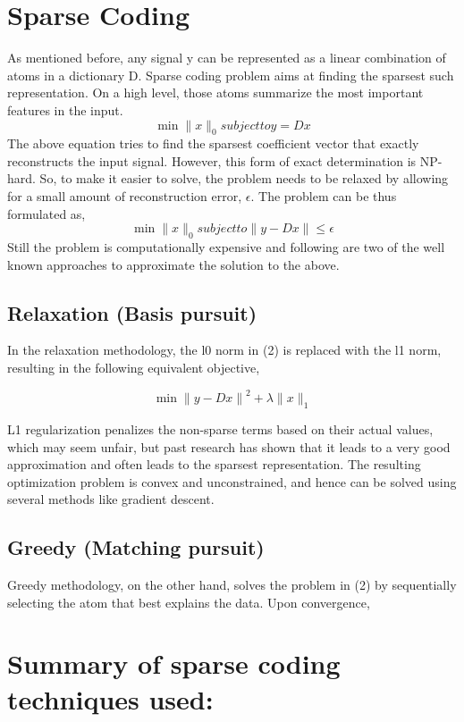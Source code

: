 \documentclass{article} %
\begin{document}
\section{Sparse Coding}
As mentioned before, any signal y can be represented as a linear combination of atoms in a dictionary D. Sparse coding problem aims at finding the sparsest such representation. On a high level, those atoms summarize the most important features in the input.\\
\[\min\|x\|_0  subject to y=Dx\]
The above equation tries to find the sparsest coefficient vector that exactly reconstructs the input signal. However, this form of exact determination is NP-hard. So, to make it easier to solve, the problem needs to be relaxed by allowing for a small amount of reconstruction error, $\epsilon$. The problem can be thus formulated as,\\
\[\min\|x\|_0  subject to \|y-Dx\| \leq \epsilon\]
Still the problem is computationally expensive and following are two of the well known approaches to approximate the solution to the above.
\subsection{Relaxation (Basis pursuit)}

In the relaxation methodology, the l0 norm in (2) is replaced with the l1 norm, resulting in the following equivalent objective,

\[\min{\|y-Dx\|}^2 +\lambda \|x\|_1\]

L1 regularization penalizes the non-sparse terms based on their actual values, which may seem unfair, but past research has shown that it leads to a very good approximation and often leads to the sparsest representation.  The resulting optimization problem is convex and unconstrained, and hence can be solved using several methods like gradient descent.


\subsection{Greedy (Matching pursuit)}
Greedy methodology, on the other hand, solves the problem in (2) by sequentially selecting the atom that best explains the data. Upon convergence, 



\section{Summary of sparse coding techniques used:}
\end{document}
